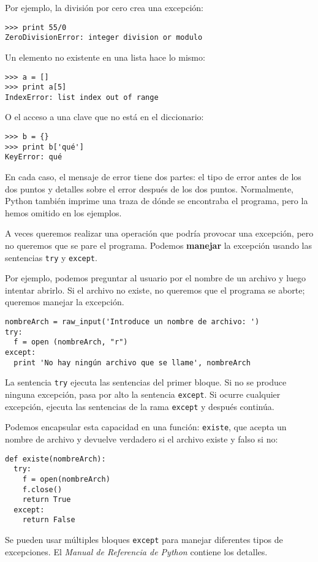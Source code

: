 Por ejemplo, la división por cero crea una excepción:

\beforeverb
\begin{verbatim}
>>> print 55/0
ZeroDivisionError: integer division or modulo
\end{verbatim}
\afterverb
%
Un elemento no existente en una lista hace lo mismo:

\beforeverb
\begin{verbatim}
>>> a = []
>>> print a[5]
IndexError: list index out of range
\end{verbatim}
\afterverb
%
O el acceso a una clave que no está en el diccionario:

\begin{verbatim}
>>> b = {}
>>> print b['qué']
KeyError: qué
\end{verbatim}
%
En cada caso, el mensaje de error tiene dos partes: el tipo
de error antes de los dos puntos y detalles sobre el error después
de los dos puntos. Normalmente, Python también imprime una traza de
dónde se encontraba el programa, pero la hemos omitido en los ejemplos.


A veces queremos realizar una operación que podría provocar una
excepción, pero no queremos que se pare el programa. Podemos
{\bf manejar} la excepción usando las sentencias \texttt{try} y
\texttt{except}.

Por ejemplo, podemos preguntar al usuario por el nombre de un archivo
y luego intentar abrirlo. Si el archivo no existe, no queremos que el
programa se aborte; queremos manejar la excepción.

\begin{verbatim}
nombreArch = raw_input('Introduce un nombre de archivo: ')
try:
  f = open (nombreArch, "r")
except:
  print 'No hay ningún archivo que se llame', nombreArch
\end{verbatim}
%
La sentencia \texttt{try} ejecuta las sentencias del primer bloque.
Si no se produce ninguna excepción, pasa por alto la sentencia
\texttt{except}. Si ocurre cualquier excepción, ejecuta las sentencias
de la rama \texttt{except} y después continúa.

Podemos encapsular esta capacidad en una función: \texttt{existe}, que acepta un
nombre de archivo y devuelve verdadero si el archivo existe y falso si no:

\begin{verbatim}
def existe(nombreArch):
  try:
    f = open(nombreArch)
    f.close()
    return True
  except:
    return False
\end{verbatim}
%
Se pueden usar múltiples bloques \texttt{except} para manejar diferentes tipos
de excepciones. El {\em Manual de Referencia de Python} contiene los detalles.



